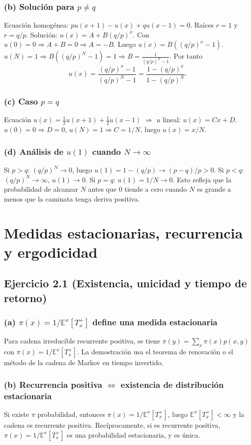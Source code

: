 \documentclass[12pt]{article}
\newcommand{\E}{\mathbb{E}}
\newcommand{\1}{\mathbf{1}}
\begin{document}
\subsubsection*{(b) Soluci\'on para $p\neq q$}
Ecuaci\'on homog\'enea: $pu(x+1)-u(x)+qu(x-1)=0$. Ra\'ices $r=1$ y $r=q/p$. Soluci\'on: $u(x)=A+B(q/p)^x$. Con $u(0)=0\Rightarrow A+B=0\Rightarrow A=-B$. Luego $u(x)=B((q/p)^x-1)$. $u(N)=1\Rightarrow B((q/p)^N-1)=1\Rightarrow B=\frac{1}{(q/p)^N-1}$. Por tanto
\[
u(x)=\frac{(q/p)^x-1}{(q/p)^N-1}=\frac{1-(q/p)^x}{1-(q/p)^N}.
\]

\subsubsection*{(c) Caso $p=q$}
Ecuaci\'on $u(x)=\frac12u(x+1)+\frac12u(x-1)$ $\Rightarrow$ $u$ lineal: $u(x)=Cx+D$. $u(0)=0\Rightarrow D=0$, $u(N)=1\Rightarrow C=1/N$, luego $u(x)=x/N$.

\subsubsection*{(d) An\'alisis de $u(1)$ cuando $N\to\infty$}
Si $p>q$: $(q/p)^N\to0$, luego $u(1)=1-(q/p)\to (p-q)/p>0$. Si $p<q$: $(q/p)^N\to\infty$, $u(1)\to0$. Si $p=q$: $u(1)=1/N\to0$. Esto refleja que la probabilidad de alcanzar $N$ antes que $0$ tiende a cero cuando $N$ es grande a menos que la caminata tenga deriva positiva.

\section{Medidas estacionarias, recurrencia y ergodicidad}

\subsection{Ejercicio 2.1 (Existencia, unicidad y tiempo de retorno)}

\subsubsection*{(a) $\pi(x)=1/\E^x[T_x^+]$ define una medida estacionaria}
Para cadena irreducible recurrente positiva, se tiene $\pi(y)=\sum_x\pi(x)p(x,y)$ con $\pi(x)=1/\E^x[T_x^+]$. La demostraci\'on usa el teorema de renovaci\'on o el m\'etodo de la cadena de Markov en tiempo invertido.

\subsubsection*{(b) Recurrencia positiva $\iff$ existencia de distribuci\'on estacionaria}
Si existe $\pi$ probabilidad, entonces $\pi(x)=1/\E^x[T_x^+]$, luego $\E^x[T_x^+]<\infty$ y la cadena es recurrente positiva. Rec\'iprocamente, si es recurrente positiva, $\pi(x)=1/\E^x[T_x^+]$ es una probabilidad estacionaria, y es \'unica.
\end{document}

